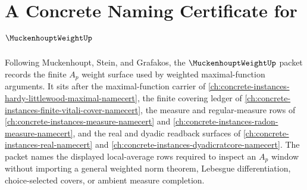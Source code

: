 \chapter{A Concrete Naming Certificate for $\MuckenhouptWeightUp$}
\label{ch:concrete-instances-muckenhoupt-weight-namecert}

Following Muckenhoupt, Stein, and Grafakos, the $\MuckenhouptWeightUp$ packet records the finite $A_p$ weight surface used by weighted maximal-function arguments. It sits after the maximal-function carrier of \autoref{ch:concrete-instances-hardy-littlewood-maximal-namecert}, the finite covering ledger of \autoref{ch:concrete-instances-finite-vitali-cover-namecert}, the measure and regular-measure rows of \autoref{ch:concrete-instances-measure-namecert} and \autoref{ch:concrete-instances-radon-measure-namecert}, and the real and dyadic readback surfaces of \autoref{ch:concrete-instances-real-namecert} and \autoref{ch:concrete-instances-dyadicratcore-namecert}. The packet names the displayed local-average rows required to inspect an $A_p$ window without importing a general weighted norm theorem, Lebesgue differentiation, choice-selected covers, or ambient measure completion.

